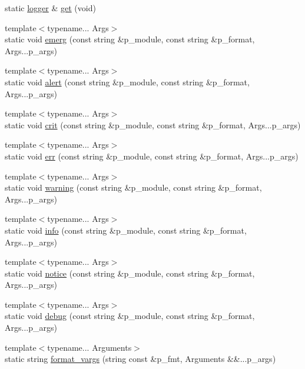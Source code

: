 \begin{DoxyCompactItemize}
\item 
static \hyperlink{classxtd_1_1logger}{logger} \& \hyperlink{classxtd_1_1logger_a21511dfdad9ec1e88c3444637a000e9d}{get} (void)
\item 
{\footnotesize template$<$typename... Args$>$ }\\static void \hyperlink{classxtd_1_1logger_a07697b74619641014fb6e51130b5c837}{emerg} (const string \&p\-\_\-module, const string \&p\-\_\-format, Args...\-p\-\_\-args)
\item 
{\footnotesize template$<$typename... Args$>$ }\\static void \hyperlink{classxtd_1_1logger_abea0d6d16f6138d94e9373457fa08513}{alert} (const string \&p\-\_\-module, const string \&p\-\_\-format, Args...\-p\-\_\-args)
\item 
{\footnotesize template$<$typename... Args$>$ }\\static void \hyperlink{classxtd_1_1logger_a1725596996a6060db5055c499c9ec9d1}{crit} (const string \&p\-\_\-module, const string \&p\-\_\-format, Args...\-p\-\_\-args)
\item 
{\footnotesize template$<$typename... Args$>$ }\\static void \hyperlink{classxtd_1_1logger_a20f991c43e729cf84d5d5294b947091e}{err} (const string \&p\-\_\-module, const string \&p\-\_\-format, Args...\-p\-\_\-args)
\item 
{\footnotesize template$<$typename... Args$>$ }\\static void \hyperlink{classxtd_1_1logger_a7432d0a490aef6bfe2de6f5ff5b77c06}{warning} (const string \&p\-\_\-module, const string \&p\-\_\-format, Args...\-p\-\_\-args)
\item 
{\footnotesize template$<$typename... Args$>$ }\\static void \hyperlink{classxtd_1_1logger_ac6cf4c5d929c844041ea9763cc3926be}{info} (const string \&p\-\_\-module, const string \&p\-\_\-format, Args...\-p\-\_\-args)
\item 
{\footnotesize template$<$typename... Args$>$ }\\static void \hyperlink{classxtd_1_1logger_a74886bf7a5d2bb1f2b2bf0265b13b38b}{notice} (const string \&p\-\_\-module, const string \&p\-\_\-format, Args...\-p\-\_\-args)
\item 
{\footnotesize template$<$typename... Args$>$ }\\static void \hyperlink{classxtd_1_1logger_a53a77a287f7a29d9585898dcff910254}{debug} (const string \&p\-\_\-module, const string \&p\-\_\-format, Args...\-p\-\_\-args)
\item 
{\footnotesize template$<$typename... Arguments$>$ }\\static string \hyperlink{classxtd_1_1logger_a169ce6459fe906cb5f840bdf2669e8ce}{format\-\_\-vargs} (string const \&p\-\_\-fmt, Arguments \&\&...p\-\_\-args)
\end{DoxyCompactItemize}


